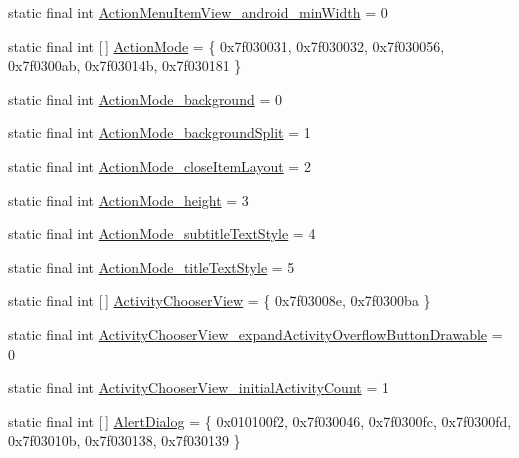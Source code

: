 \begin{DoxyCompactItemize}
static final int \mbox{\hyperlink{classandroid_1_1support_1_1design_1_1R_1_1styleable_acb1426b9ed9e5ecec8248ef97861f86c}{Action\+Menu\+Item\+View\+\_\+android\+\_\+min\+Width}} = 0
\item 
static final int \mbox{[}$\,$\mbox{]} \mbox{\hyperlink{classandroid_1_1support_1_1design_1_1R_1_1styleable_aece7cc3345738baf4a59955f870e1507}{Action\+Mode}} = \{ 0x7f030031, 0x7f030032, 0x7f030056, 0x7f0300ab, 0x7f03014b, 0x7f030181 \}
\item 
static final int \mbox{\hyperlink{classandroid_1_1support_1_1design_1_1R_1_1styleable_a2fcf62896806a253284078a92c738931}{Action\+Mode\+\_\+background}} = 0
\item 
static final int \mbox{\hyperlink{classandroid_1_1support_1_1design_1_1R_1_1styleable_a4cfd294b7efa80be3857b174e845a22b}{Action\+Mode\+\_\+background\+Split}} = 1
\item 
static final int \mbox{\hyperlink{classandroid_1_1support_1_1design_1_1R_1_1styleable_aa67ed1373f9b46d1e3338368326909dd}{Action\+Mode\+\_\+close\+Item\+Layout}} = 2
\item 
static final int \mbox{\hyperlink{classandroid_1_1support_1_1design_1_1R_1_1styleable_a14760d08c455c5f160e63389c6e0a2a8}{Action\+Mode\+\_\+height}} = 3
\item 
static final int \mbox{\hyperlink{classandroid_1_1support_1_1design_1_1R_1_1styleable_a10bc3c198873b4b55ca3d7a3a03b0b3d}{Action\+Mode\+\_\+subtitle\+Text\+Style}} = 4
\item 
static final int \mbox{\hyperlink{classandroid_1_1support_1_1design_1_1R_1_1styleable_a00160252e8c184b0cb941db7fa9b3422}{Action\+Mode\+\_\+title\+Text\+Style}} = 5
\item 
static final int \mbox{[}$\,$\mbox{]} \mbox{\hyperlink{classandroid_1_1support_1_1design_1_1R_1_1styleable_a793c8e02386efdda6b3cf815e635b3fe}{Activity\+Chooser\+View}} = \{ 0x7f03008e, 0x7f0300ba \}
\item 
static final int \mbox{\hyperlink{classandroid_1_1support_1_1design_1_1R_1_1styleable_a0f59ec2d875fa33d8606d30a159009e2}{Activity\+Chooser\+View\+\_\+expand\+Activity\+Overflow\+Button\+Drawable}} = 0
\item 
static final int \mbox{\hyperlink{classandroid_1_1support_1_1design_1_1R_1_1styleable_ac585173d17be15bb17e5558aecd007fc}{Activity\+Chooser\+View\+\_\+initial\+Activity\+Count}} = 1
\item 
static final int \mbox{[}$\,$\mbox{]} \mbox{\hyperlink{classandroid_1_1support_1_1design_1_1R_1_1styleable_aeccb758d25f6e242e6f3a23f3873ec21}{Alert\+Dialog}} = \{ 0x010100f2, 0x7f030046, 0x7f0300fc, 0x7f0300fd, 0x7f03010b, 0x7f030138, 0x7f030139 \}

\end{DoxyCompactItemize}
